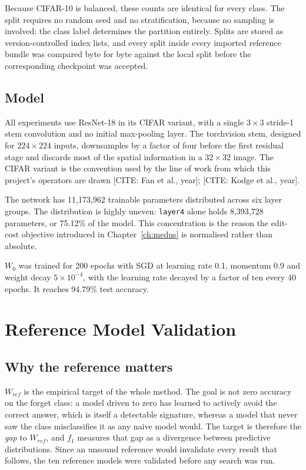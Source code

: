 Because CIFAR-10 is balanced, these counts are identical for every class. The
split requires no random seed and no stratification, because no sampling is
involved: the class label determines the partition entirely. Splits are stored as
version-controlled index lists, and every split inside every imported reference
bundle was compared byte for byte against the local split before the corresponding
checkpoint was accepted.

\subsection{Model}

All experiments use ResNet-18 in its CIFAR variant, with a single
$3\times3$ stride-1 stem convolution and no initial max-pooling layer. The
torchvision stem, designed for $224\times224$ inputs, downsamples by a factor of
four before the first residual stage and discards most of the spatial information
in a $32\times32$ image. The CIFAR variant is the convention used by the line of
work from which this project's operators are drawn
[CITE: Fan et al., year]; [CITE: Kodge et al., year].

The network has 11{,}173{,}962 trainable parameters distributed across six layer
groups. The distribution is highly uneven: \texttt{layer4} alone holds
8{,}393{,}728 parameters, or 75.12\% of the model. This concentration is the
reason the edit-cost objective introduced in Chapter~\ref{ch:medus} is normalised
rather than absolute.

$W_0$ was trained for 200 epochs with SGD at learning rate 0.1, momentum 0.9 and
weight decay $5\times10^{-4}$, with the learning rate decayed by a factor of ten
every 40 epochs. It reaches 94.79\% test accuracy.

\section{Reference Model Validation}
\label{sec:exp-reference}

\subsection{Why the reference matters}

$W_{ref}$ is the empirical target of the whole method. The goal is not zero
accuracy on the forget class: a model driven to zero has learned to actively avoid
the correct answer, which is itself a detectable signature, whereas a model that
never saw the class misclassifies it as any naive model would. The target is
therefore the \emph{gap} to $W_{ref}$, and $f_1$ measures that gap as a divergence
between predictive distributions. Since an unsound reference would invalidate
every result that follows, the ten reference models were validated before any
search was run.

